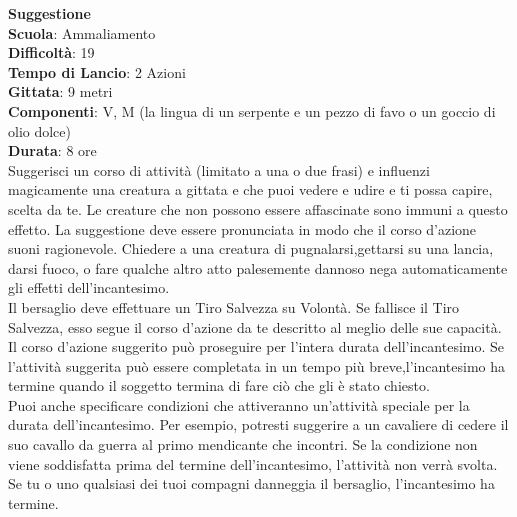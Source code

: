 \begin{multicols}{2}
\medskip\textbf{Suggestione}\\
\textbf{Scuola}: Ammaliamento\\
\textbf{Difficoltà}: 19\\
\textbf{Tempo di Lancio}: 2 Azioni\\
\textbf{Gittata}: 9 metri\\
\textbf{Componenti}: V, M (la lingua di un serpente e un pezzo di favo o un goccio di olio dolce)\\
\textbf{Durata}: 8 ore \\
Suggerisci un corso di attività (limitato a una o due frasi) e influenzi magicamente una creatura a gittata e che puoi vedere e udire e ti possa capire, scelta da te. Le creature che non possono essere affascinate sono immuni a questo effetto. La suggestione deve essere pronunciata in modo che il corso d'azione suoni ragionevole. Chiedere a una creatura di pugnalarsi,gettarsi su una lancia, darsi fuoco, o fare qualche altro atto palesemente dannoso nega automaticamente gli effetti dell'incantesimo.\\
Il bersaglio deve effettuare un Tiro Salvezza su Volontà. Se fallisce il Tiro Salvezza, esso segue il corso d'azione da te descritto al meglio delle sue capacità. Il corso d'azione suggerito può proseguire per l'intera durata dell'incantesimo. Se l'attività suggerita può essere completata in un tempo più breve,l'incantesimo ha termine quando il soggetto termina di fare ciò che gli è stato chiesto.\\
Puoi anche specificare condizioni che attiveranno un'attività speciale per la durata dell'incantesimo. Per esempio, potresti suggerire a un cavaliere di cedere il suo cavallo da guerra al primo mendicante che incontri. Se la condizione non viene soddisfatta prima del termine dell'incantesimo, l'attività non verrà svolta. Se tu o uno qualsiasi dei tuoi compagni danneggia il bersaglio, l'incantesimo ha termine.\\


\end{multicols}
